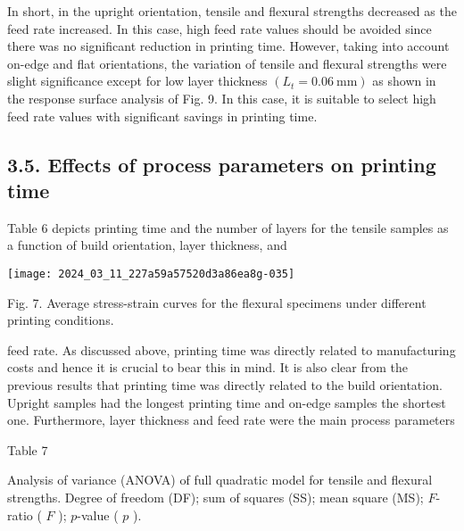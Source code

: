 \documentclass[10pt]{article}
\begin{document}
In short, in the upright orientation, tensile and flexural strengths decreased as the feed rate increased. In this case, high feed rate values should be avoided since there was no significant reduction in printing time. However, taking into account on-edge and flat orientations, the variation of tensile and flexural strengths were slight significance except for low layer thickness $\left(L_{t}=0.06 \mathrm{~mm}\right)$ as shown in the response surface analysis of Fig. 9. In this case, it is suitable to select high feed rate values with significant savings in printing time.

\subsection*{3.5. Effects of process parameters on printing time}
Table 6 depicts printing time and the number of layers for the tensile samples as a function of build orientation, layer thickness, and

\begin{center}
\texttt{[image: 2024\_03\_11\_227a59a57520d3a86ea8g-035]}
\end{center}

Fig. 7. Average stress-strain curves for the flexural specimens under different printing conditions.

feed rate. As discussed above, printing time was directly related to manufacturing costs and hence it is crucial to bear this in mind. It is also clear from the previous results that printing time was directly related to the build orientation. Upright samples had the longest printing time and on-edge samples the shortest one. Furthermore, layer thickness and feed rate were the main process parameters

Table 7

Analysis of variance (ANOVA) of full quadratic model for tensile and flexural strengths. Degree of freedom (DF); sum of squares (SS); mean square (MS); $F$-ratio ( $F$ ); $p$-value ( $p$ ).
\end{document}
